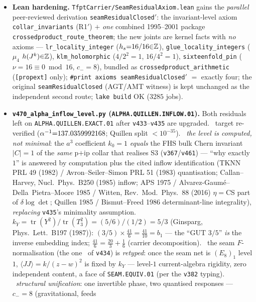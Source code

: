 \begin{itemize}
\item \textbf{Lean hardening.} \texttt{TfptCarrier/SeamResidualAxiom.lean} gains the \emph{parallel}
peer-reviewed derivation \texttt{seamResidualClosed$'$}: the invariant-level axiom
\texttt{collar\_invariants} (R1$'$) $+$ \emph{one} combined 1995--2001 package
\texttt{crossedproduct\_route\_theorem}; the new joints are kernel facts with \emph{no} axioms ---
\texttt{lr\_locality\_integer} ($h_s{=}16/16{\in}\mathbb{Z}$), \texttt{glue\_locality\_integers}
($\mu_4$ $h(J^k){\in}\mathbb{Z}$), \texttt{klm\_holomorphic} ($4/2^2{=}1$, $16/4^2{=}1$),
\texttt{sixteenfold\_pin} ($\nu{=}16{\equiv}0\bmod 16$, $c_-{=}8$), bundled as
\texttt{crossedproduct\_arithmetic} (\texttt{[propext]} only); \texttt{\#print axioms
seamResidualClosed$'$} $=$ exactly four; the original \texttt{seamResidualClosed} (AGT/AMT witness)
is kept unchanged as the independent second route; \texttt{lake build} OK ($3285$ jobs).
\item \textbf{\texttt{v470\_alpha\_inflow\_level.py} (\texttt{ALPHA.QUILLEN.INFLOW.01}).}
Both residuals left on \texttt{ALPHA.QUILLEN.EXACT.01} after \texttt{v433}--\texttt{v435} are
upgraded. \mE\ target re-verified ($\alpha^{-1}{=}137.0359992168$; Quillen split ${<}10^{-35}$).
\mC\ \emph{the level is computed, not minimal}: the $a^3$ coefficient $k_0{=}1$ \emph{equals} the
FHS bulk Chern invariant $|C|{=}1$ of the \emph{same} p$+$ip collar that realises S3
(\texttt{v367}/\texttt{v461}) --- ``why exactly $1$'' is answered by computation plus the cited
inflow identification (TKNN PRL 49 (1982) / Avron--Seiler--Simon PRL 51 (1983) quantisation;
Callan--Harvey, Nucl.\ Phys.\ B250 (1985) inflow; APS 1975 / Alvarez-Gaum\'e--Della~Pietra--Moore
1985 / Witten, Rev.\ Mod.\ Phys.\ 88 (2016) $\eta{=}$CS part of $\delta\log\det$; Quillen 1985 /
Bismut--Freed 1986 determinant-line integrality), \emph{replacing} \texttt{v435}'s minimality
assumption. \mE\ $k_Y{=}\operatorname{tr}(Y^2)/\operatorname{tr}(T_3^2){=}(5/6)/(1/2){=}5/3$
(Ginsparg, Phys.\ Lett.\ B197 (1987)): $(3/5){\times}\tfrac{41}{6}{=}\tfrac{41}{10}{=}b_1$ --- the
``GUT $3/5$'' \emph{is} the inverse embedding index; $\tfrac{41}{6}{=}\tfrac{20}{3}{+}\tfrac16$
(carrier decomposition). \mC\ the seam $F$-normalisation (the one \mC\ of \texttt{v434}) is
\emph{retyped}: once the seam net is $(E_8)_1$ level $1$, $\langle JJ\rangle{=}k/(z{-}w)^2$ is fixed
by $k_Y$ --- level-$1$ current-algebra rigidity, zero independent content, a face of
\texttt{SEAM.EQUIV.01} (per the \texttt{v382} typing). \mE\ \emph{structural unification}: one
invertible phase, two quantised responses --- $c_-{=}8$ (gravitational, feeds

\end{itemize}
